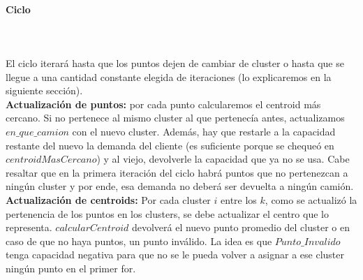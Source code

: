 \paragraph{Ciclo}\hspace{0pt} \\
\\
\indent El ciclo iterará hasta que los puntos dejen de cambiar de cluster o hasta que se llegue a una cantidad constante elegida de iteraciones (lo explicaremos en la siguiente sección).\hspace{0pt} \\
\indent \textbf{Actualización de puntos:} por cada punto calcularemos el centroid más cercano. Si no pertenece al mismo cluster al que pertenecía antes, actualizamos $en\_que\_camion$ con el nuevo cluster. Además, hay que restarle a la capacidad restante del nuevo la demanda del cliente (es suficiente porque se chequeó en $centroidMasCercano$) y al viejo, devolverle la capacidad que ya no se usa. Cabe resaltar que en la primera iteración del ciclo habrá puntos que no pertenezcan a ningún cluster y por ende, esa demanda no deberá ser devuelta a ningún camión.\hspace{0pt} \\
\indent \textbf{Actualización de centroids:} Por cada cluster $i$ entre los $k$, como se actualizó la pertenencia de los puntos en los clusters, se debe actualizar el centro que lo representa.  $calcularCentroid$ devolverá el nuevo punto promedio del cluster o en caso de que no haya puntos, un punto inválido. La idea es que $Punto\_Invalido$ tenga capacidad negativa para que no se le pueda volver a asignar a ese cluster ningún punto en el primer for.

